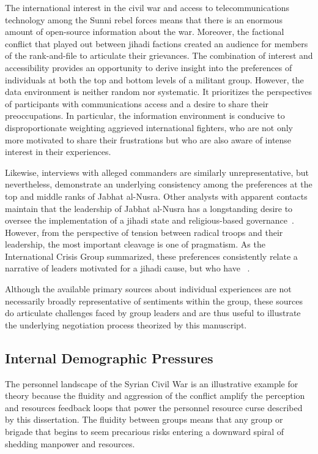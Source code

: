 The international interest in the civil war and access to telecommunications technology among the Sunni rebel forces means that there is an enormous amount of open-source information about the war.  Moreover, the factional conflict that played out between jihadi factions created an audience for members of the rank-and-file to articulate their grievances. The combination of interest and accessibility provides an opportunity to derive insight into the preferences of individuals at both the top and bottom levels of a militant group.  However, the data environment is neither random nor systematic. It prioritizes the perspectives of participants with communications access and a desire to share their preoccupations. In particular, the information environment is conducive to disproportionate weighting aggrieved international fighters, who are not only more motivated to share their frustrations but who are also aware of intense interest in their experiences.

Likewise, interviews with alleged commanders are similarly unrepresentative, but nevertheless, demonstrate an underlying consistency among the preferences at the top and middle ranks of Jabhat al-Nusra. Other analysts with apparent contacts maintain that the leadership of Jabhat al-Nusra has a longstanding desire to oversee the implementation of a jihadi state and religious-based governance~\autocite{icg2019best, lister2016profiling}. However, from the perspective of tension between radical troops and their leadership, the most important cleavage is one of pragmatism. As the International Crisis Group summarized, these preferences consistently relate a narrative of leaders motivated for a jihadi cause, but who have ~\autocite{icg2019best}. 

Although the available primary sources about individual experiences are not necessarily broadly representative of sentiments within the group, these sources do articulate challenges faced by group leaders and are thus useful to illustrate the underlying negotiation process theorized by this manuscript.

\subsection{Internal Demographic Pressures}

The personnel landscape of the Syrian Civil War is an illustrative example for theory because the fluidity and aggression of the conflict amplify the perception and resources feedback loops that power the personnel resource curse described by this dissertation.  The fluidity between groups means that any group or brigade that begins to seem precarious risks entering a downward spiral of shedding manpower and resources. 

